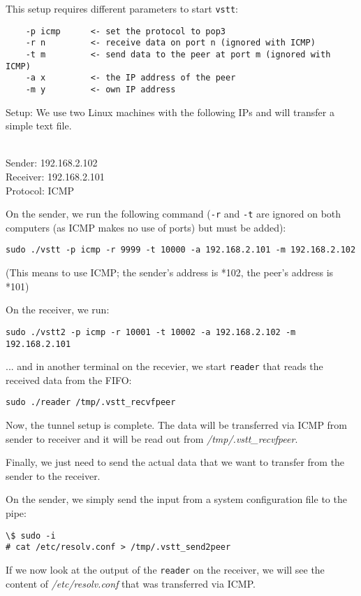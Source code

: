 \documentclass[10pt,a4paper]{article}
\begin{document}
This setup requires different parameters to start \texttt{vstt}:

\begin{verbatim}
	-p icmp      <- set the protocol to pop3
	-r n         <- receive data on port n (ignored with ICMP)
	-t m         <- send data to the peer at port m (ignored with ICMP)
	-a x         <- the IP address of the peer
	-m y         <- own IP address
\end{verbatim}
 
 
Setup: We use two Linux machines with the following IPs and will transfer a simple text file.

~\\
Sender:   192.168.2.102\\
Receiver: 192.168.2.101\\
Protocol: ICMP

On the sender, we run the following command (\texttt{-r} and \texttt{-t} are ignored on both computers (as ICMP makes no use of ports) but must be added):

\texttt{sudo ./vstt -p icmp -r 9999 -t 10000 -a 192.168.2.101 -m 192.168.2.102}

(This means to use ICMP; the sender's address is *102, the peer's address is *101)

On the receiver, we run:

\texttt{sudo ./vstt2 -p icmp -r 10001 -t 10002 -a 192.168.2.102 -m 192.168.2.101}

... and in another terminal on the recevier, we start \texttt{reader} that reads the received data from the FIFO:

\texttt{sudo ./reader /tmp/.vstt\_recvfpeer}

Now, the tunnel setup is complete. The data will be transferred via ICMP
from sender to receiver and it will be read out from \textit{/tmp/.vstt\_recvfpeer}.

Finally, we just need to send the actual data that we want to transfer from the sender to the receiver.

On the sender, we simply send the input from a system configuration file to the pipe:

\begin{verbatim}
\$ sudo -i
# cat /etc/resolv.conf > /tmp/.vstt_send2peer
\end{verbatim}

If we now look at the output of the \texttt{reader} on the receiver, we will see
the content of \textit{/etc/resolv.conf} that was transferred via ICMP.
\end{document}

